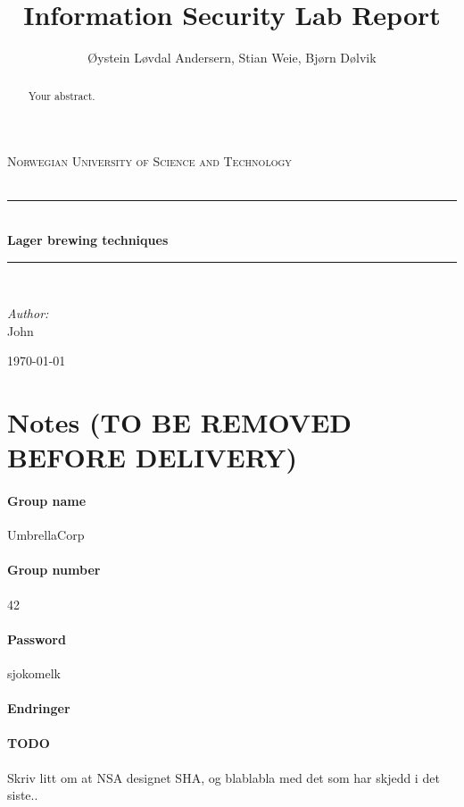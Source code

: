 \documentclass[11pt, a4paper]{article}
\title{Information Security Lab Report}
\author{Øystein Løvdal Andersern, Stian Weie, Bjørn Dølvik}
\newcommand{\HRule}{\rule{\linewidth}{0.5mm}}
\begin{document}
\begin{titlepage}
\begin{center}

\textsc{\LARGE Norwegian University of Science and Technology}\\[1.5cm]

\textsc{\Large }\\[0.5cm]

\HRule \\[0.4cm]
{ \huge \bfseries Lager brewing techniques \\[0.4cm] }

\HRule \\[1.5cm]

\begin{minipage}{0.4\textwidth}
\begin{flushleft} \large
\emph{Author:}\\
        John \textsc{}
        \end{flushleft}
        \end{minipage}

        \vfill

{\large \today}

\end{center}
\end{titlepage}

\begin{abstract}
Your abstract.
\end{abstract}
\section{Notes (TO BE REMOVED BEFORE DELIVERY)}
\paragraph{Group name} UmbrellaCorp
\paragraph{Group number} 42
\paragraph{Password} sjokomelk
\paragraph{Endringer} 
\paragraph{TODO} Skriv litt om at NSA designet SHA, og blablabla med det som har skjedd i det siste..
\end{document}
